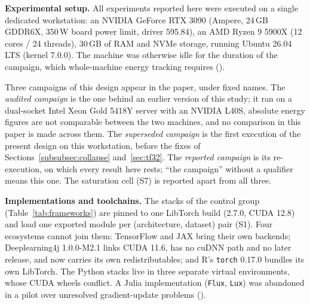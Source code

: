 \textbf{Experimental setup.}
All experiments reported here were executed on a single dedicated workstation:
an NVIDIA GeForce RTX 3090 (Ampere, 24\,GB GDDR6X, 350\,W board power limit,
driver 595.84), an AMD Ryzen 9 5900X (12 cores / 24 threads), 30\,GB of RAM and
NVMe storage, running Ubuntu 26.04 LTS (kernel 7.0.0). The machine was otherwise
idle for the duration of the campaign, which whole-machine energy tracking
requires ().

Three campaigns of this design appear in the paper, under fixed names. The
\emph{audited campaign} is the one behind an earlier version of this study; it
ran on a dual-socket Intel Xeon Gold 5418Y server with an NVIDIA L40S, absolute
energy figures are not comparable between the two machines, and no comparison
in this paper is made across them. The \emph{superseded campaign} is the first
execution of the present design on this workstation, before the fixes of
Sections~\ref{subsubsec:collapse} and~\ref{sec:tf32}. The \emph{reported
campaign} is its re-execution, on which every result here rests; ``the
campaign'' without a qualifier means this one. The saturation cell (S7) is
reported apart from all three.

\textbf{Implementations and toolchains.} The \vCtrlStacks{} stacks of the
control group (Table~\ref{tab:frameworks}) are pinned to one LibTorch build
(2.7.0, CUDA 12.8) and load one exported module per (architecture, dataset) pair
(S1). Four ecosystems cannot join them: TensorFlow and JAX bring their
own backends; Deeplearning4j 1.0.0-M2.1 links CUDA 11.6, has no cuDNN path and
no later release, and now carries its own redistributables; and R's
\texttt{torch} 0.17.0 bundles its own LibTorch. The Python stacks live in three
separate virtual environments, whose CUDA wheels conflict. A Julia implementation (\texttt{Flux}, \texttt{Lux}) was abandoned in a pilot
over unresolved gradient-update problems ().

